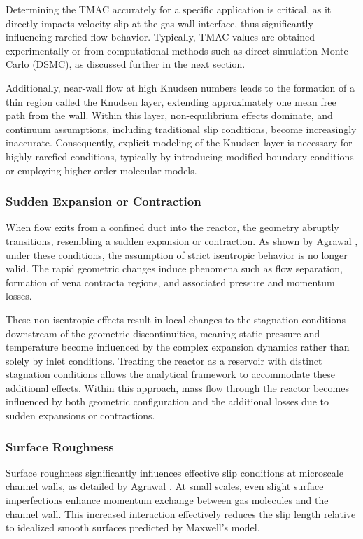	Determining the TMAC accurately for a specific application is critical, as it directly impacts velocity slip at the gas-wall interface, thus significantly influencing rarefied flow behavior.
	Typically, TMAC values are obtained experimentally or from computational methods such as direct simulation Monte Carlo (DSMC), as discussed further in the next section.

	Additionally, near-wall flow at high Knudsen numbers leads to the formation of a thin region called the Knudsen layer, extending approximately one mean free path from the wall.
	Within this layer, non-equilibrium effects dominate, and continuum assumptions, including traditional slip conditions, become increasingly inaccurate.
	Consequently, explicit modeling of the Knudsen layer is necessary for highly rarefied conditions, typically by introducing modified boundary conditions or employing higher-order molecular models.

\subsubsection*{Sudden Expansion or Contraction}
	When flow exits from a confined duct into the reactor, the geometry abruptly transitions, resembling a sudden expansion or contraction.
	As shown by Agrawal \cite{agrawal_comprehensive_2011}, under these conditions, the assumption of strict isentropic behavior is no longer valid.
	The rapid geometric changes induce phenomena such as flow separation, formation of vena contracta regions, and associated pressure and momentum losses.

	These non-isentropic effects result in local changes to the stagnation conditions downstream of the geometric discontinuities, meaning static pressure and temperature become influenced by the complex expansion dynamics rather than solely by inlet conditions.
	Treating the reactor as a reservoir with distinct stagnation conditions allows the analytical framework to accommodate these additional effects.
	Within this approach, mass flow through the reactor becomes influenced by both geometric configuration and the additional losses due to sudden expansions or contractions.

\subsubsection*{Surface Roughness}
	Surface roughness significantly influences effective slip conditions at microscale channel walls, as detailed by Agrawal \cite{agrawal_comprehensive_2011}.
	At small scales, even slight surface imperfections enhance momentum exchange between gas molecules and the channel wall.
	This increased interaction effectively reduces the slip length relative to idealized smooth surfaces predicted by Maxwell's model.

